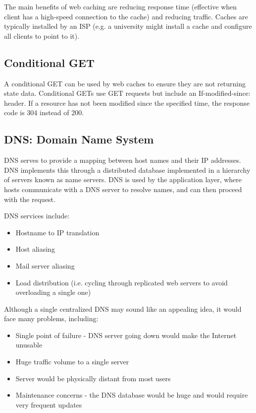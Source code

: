 \documentclass[12pt,titlepage]{article}
\begin{document}
      The main benefits of web caching are reducing response time (effective when client has a high-speed connection to the cache) and reducing traffic. Caches are typically
      installed by an ISP (e.g. a university might install a cache and configure all clients to point to it).

    \subsection{Conditional GET}
      A conditional GET can be used by web caches to ensure they are not returning state data. Conditional GETs use GET requests but include an If-modified-since: header.
      If a resource has not been modified since the specified time, the response code is 304 instead of 200.

    \subsection{DNS: Domain Name System}
      DNS serves to provide a mapping between host names and their IP addresses. DNS implements this through a distributed database implemented in a hierarchy of servers
      known as name servers. DNS is used by the application layer, where hosts communicate with a DNS server to resolve names, and can then proceed with the request.

      DNS services include:
      \begin{itemize}
        \item Hostname to IP translation
        \item Host aliasing
        \item Mail server aliasing
        \item Load distribution (i.e. cycling through replicated web servers to avoid overloading a single one)
      \end{itemize}

      Although a single centralized DNS may sound like an appealing idea, it would face many problems, including:
      \begin{itemize}
        \item Single point of failure - DNS server going down would make the Internet unusable
        \item Huge traffic volume to a single server
        \item Server would be physically distant from most users
        \item Maintenance concerns - the DNS database would be huge and would require very frequent updates
      \end{itemize}
\end{document}
